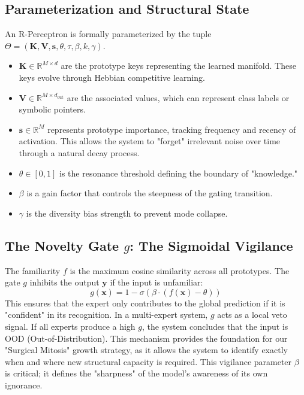 \documentclass[11pt,hidelinks]{article}
\begin{document}
\subsection{Parameterization and Structural State}
An R-Perceptron is formally parameterized by the tuple $\Theta = (\mathbf{K}, \mathbf{V}, \mathbf{s}, \theta, \tau, \beta, k, \gamma)$.
\begin{itemize}
    \item $\mathbf{K} \in \mathbb{R}^{M \times d}$ are the prototype keys representing the learned manifold. These keys evolve through Hebbian competitive learning.
    \item $\mathbf{V} \in \mathbb{R}^{M \times d_{\text{out}}}$ are the associated values, which can represent class labels or symbolic pointers.
    \item $\mathbf{s} \in \mathbb{R}^{M}$ represents prototype importance, tracking frequency and recency of activation. This allows the system to "forget" irrelevant noise over time through a natural decay process.
    \item $\theta \in [0, 1]$ is the resonance threshold defining the boundary of "knowledge." 
    \item $\beta$ is a gain factor that controls the steepness of the gating transition.
    \item $\gamma$ is the diversity bias strength to prevent mode collapse.
\end{itemize}

\subsection{The Novelty Gate $g$: The Sigmoidal Vigilance}
The familiarity $f$ is the maximum cosine similarity across all prototypes. The gate $g$ inhibits the output $\mathbf{y}$ if the input is unfamiliar:
\begin{equation}
g(\mathbf{x}) = 1 - \sigma(\beta \cdot (f(\mathbf{x}) - \theta))
\end{equation}
This ensures that the expert only contributes to the global prediction if it is "confident" in its recognition. In a multi-expert system, $g$ acts as a local veto signal. If all experts produce a high $g$, the system concludes that the input is OOD (Out-of-Distribution). This mechanism provides the foundation for our "Surgical Mitosis" growth strategy, as it allows the system to identify exactly when and where new structural capacity is required. This vigilance parameter $\beta$ is critical; it defines the "sharpness" of the model's awareness of its own ignorance.
\end{document}
